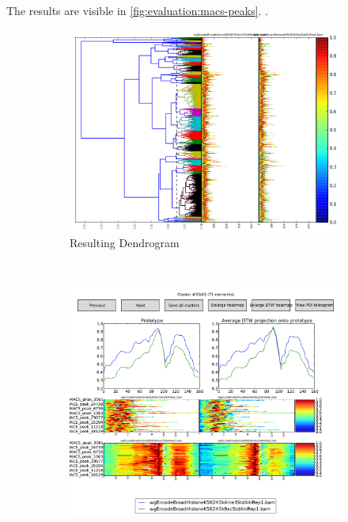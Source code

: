 \documentclass[parskip]{cs4rep}
\begin{document}
The results are visible in \autoref{fig:evaluation:macs-peaks}. .

\begin{figure}
    \centering
    \begin{subfigure}[b]{0.45\textwidth}
         \includegraphics[width=\textwidth]{figures/evaluation/macs-peaks/cut-no-preview-button.png}
         \caption{Resulting Dendrogram}
         \label{fig:evaluation:macs-peaks:cut}
    \end{subfigure}
    ~
    \begin{subfigure}[b]{0.45\textwidth}
        \includegraphics[width=\textwidth]{figures/evaluation/macs-peaks/dgw-explorer-cluster-35.pdf}

\end{subfigure}
\end{figure}
\end{document}
